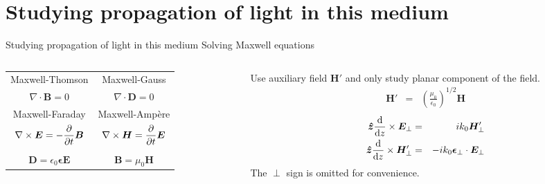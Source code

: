 \documentclass[aspectratio=169]{beamer}
\begin{document}
\section{Studying propagation of light in this medium}

\begin{frame}{Studying propagation of light in this medium}
{\huge Solving Maxwell equations}
\begin{columns}
	\begin{column}{0.5\textwidth}
		\begin{tabulary}{\linewidth}{CC}
			Maxwell-Thomson & Maxwell-Gauss\\
			\(\displaystyle\nabla\cdot\bm{B} = 0\) & \(\displaystyle\nabla\cdot\bm{D}=0\)\\
			Maxwell-Faraday & Maxwell-Ampère\\
			\(\displaystyle\nabla\times\bm{E}=-\pdv{t}\bm{B}\) & \(\displaystyle\nabla\times\bm{H}=\pdv{t}\bm{E}\)\\
			&\\
			\(\displaystyle\bm{D} = \epsilon_0\bm{\epsilon}\bm{E}\) & \(\displaystyle\bm{B} = \mu_0\bm{H}\)
		\end{tabulary}
	\end{column}
	\pause
	\begin{column}{0.5\textwidth}
		Use auxiliary field $\bm{H}'$ and only study planar component of the field.
		\begin{eqnarray*}
		\bm{H}' &=& \left(\frac{\mu_0}{\epsilon_0}\right)^{1/2}\bm{H}
		\end{eqnarray*}
		\begin{eqnarray*}
		\bm{\hat{z}}\dv{z}\times\bm{E}_\perp &=& ik_0\bm{H}'_\perp\\
		\bm{\hat{z}}\dv{z}\times\bm{H}'_\perp &=& -ik_0\bm{\epsilon}_\perp\cdot\bm{E}_\perp
		\end{eqnarray*}
		\alert{The $\perp$ sign is omitted for convenience.}
	\end{column}
\end{columns}
\end{frame}
\end{document}
